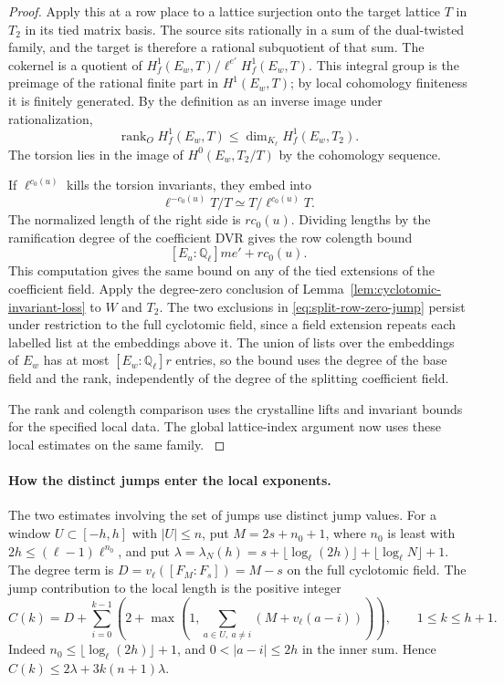 \begin{proof}
Apply this at a row place to a lattice surjection
onto the target lattice \(T\) in \(T_2\) in its tied
matrix basis. The source sits rationally in a sum of the
dual-twisted family, and the target is therefore a
rational subquotient of that sum. The cokernel is a
quotient of \(H^1_f(E_w,T)/\ell^{e'}H^1_f(E_w,T)\).
This integral group is the preimage of the rational
finite part in \(H^1(E_w,T)\); by local cohomology
finiteness it is finitely generated. By the definition as an inverse image under rationalization,
\[
 \operatorname{rank}_O H^1_f(E_w,T)\le\dim_{K_\ell}H^1_f(E_w,T_2).
\]
The torsion lies in the image
of \(H^0(E_w,T_2/T)\) by the cohomology sequence.

If \(\ell^{c_0(u)}\) kills the torsion invariants, they embed into
\[
 \ell^{-c_0(u)}T/T\simeq T/\ell^{c_0(u)}T.
\]
The normalized length of the right side is \(r c_0(u)\).
Dividing lengths by the ramification degree of the
coefficient DVR gives the row colength bound
\[
       [E_u:\mathbb Q_\ell]m e' + r c_0(u).
\]
This computation gives the same bound on any of the
tied extensions of the coefficient field. Apply the degree-zero conclusion of
Lemma~\ref{lem:cyclotomic-invariant-loss} to \(W\) and \(T_2\).
The two exclusions in \eqref{eq:split-row-zero-jump} persist
under restriction to the full cyclotomic field, since a field
extension repeats each labelled list at the embeddings above it. The union of lists over
the embeddings of \(E_w\) has at most
\([E_w:\mathbb Q_\ell]r\) entries, so the bound uses the
degree of the base field and the rank, independently of
the degree of the splitting coefficient field.

The rank and colength comparison uses the crystalline lifts and invariant bounds for the specified local data.
The global lattice-index argument now uses these
local estimates on the same family.
\label{cor:small-prime-lengths-2}
\end{proof}

\paragraph{How the distinct jumps enter the local exponents.}
The two estimates involving the set of jumps use distinct
jump values. For a window \(U\subset [-h,h]\) with
\(|U|\le n\), put \(M=2s+n_0+1\), where \(n_0\) is least
with \(2h\le(\ell-1)\ell^{n_0}\), and put
\(\lambda=\lambda_N(h)=s+\lfloor\log_\ell(2h)\rfloor+
\lfloor\log_\ell N\rfloor+1\). The degree term is
\(D=v_\ell([F_M:F_s])=M-s\) on the full cyclotomic field.
The jump contribution to the local length is the positive integer
\begin{equation}\label{eq:local-jump-loss}
 C(k)=D+\sum_{i=0}^{k-1}\left(2+\max\left(1,
       \sum_{a\in U,\ a\ne i}(M+v_\ell(a-i))\right)\right),
 \qquad 1\le k\le h+1.
\end{equation}
Indeed \(n_0\le\lfloor\log_\ell(2h)\rfloor+1\), and
\(0<|a-i|\le2h\) in the inner sum. Hence
\(C(k)\le 2\lambda+3k(n+1)\lambda\).


